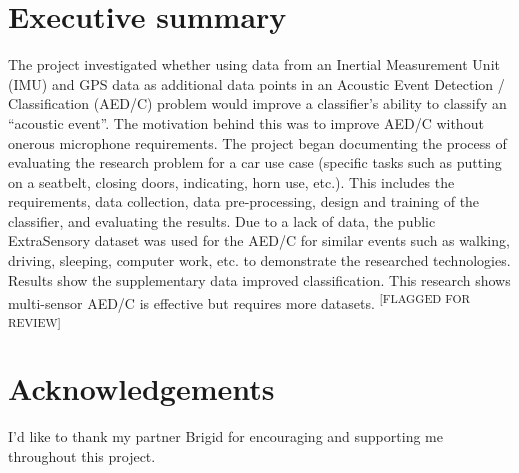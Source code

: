 \documentclass{UoNMCHA}
\newcommand{\flagforreview}{\textsuperscript{\color{red} [FLAGGED FOR REVIEW]}}
\numberwithin{equation}{section}
\begin{document}
\section*{Executive summary}
\vspace{-3mm}
The project investigated whether using data from an Inertial Measurement Unit (IMU) and GPS data as additional data points in an Acoustic Event Detection / Classification (AED/C) problem would improve a classifier's ability to classify an “acoustic event”. The motivation behind this was to improve AED/C without onerous microphone requirements. The project began documenting the process of evaluating the research problem for a car use case (specific tasks such as putting on a seatbelt, closing doors, indicating, horn use, etc.). This includes the requirements, data collection, data pre-processing, design and training of the classifier, and evaluating the results. Due to a lack of data, the public ExtraSensory dataset was used for the AED/C for similar events such as walking, driving, sleeping, computer work, etc. to demonstrate the researched technologies. Results show the supplementary data improved classification. This research shows multi-sensor AED/C is effective but requires more datasets. \flagforreview

\vspace{-2mm}
\section*{Acknowledgements}
\vspace{-3mm}
I'd like to thank my partner Brigid for encouraging and supporting me throughout this project. \\
\end{document}
